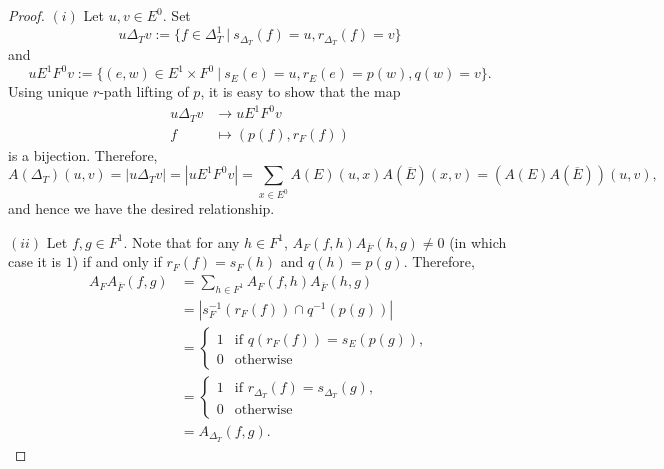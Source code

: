 \documentclass[a4paper,reqno,12pt]{amsart}
\theoremstyle{definition}
\theoremstyle{remark}
\begin{document}
\begin{proof}
$(i)$ Let $u,v\in E^0$. Set \[u\Delta_Tv:=\{f\in \Delta_T^1~|~s_{\Delta_T}(f)=u,r_{\Delta_T}(f)=v\}\] and \[uE^1F^0v:=\{(e,w)\in E^1\times F^0~|~s_E(e)=u,r_E(e)=p(w),q(w)=v\}.\] Using unique $r$-path lifting of $p$, it is easy to show that the map 
\begin{align*}
    u\Delta_Tv&\longrightarrow uE^1F^0v\\
    f&\longmapsto (p(f),r_F(f))
\end{align*}
is a bijection. Therefore, \[A(\Delta_T)(u,v)=|u\Delta_Tv|=|uE^1F^0v|=\displaystyle{\sum_{x\in E^0}}A(E)(u,x)A(\overline{E})(x,v)=(A(E)A(\overline{E}))(u,v),\] and hence we have the desired relationship.

$(ii)$ Let $f,g\in F^1$. Note that for any $h\in F^1$, $A_F(f,h)A_{\overline{F}}(h,g)\neq 0$ (in which case it is $1$) if and only if $r_F(f)=s_F(h)$ and $q(h)=p(g)$. Therefore, 
\allowdisplaybreaks
{\begin{align*}
A_F A_{\overline{F}}(f,g)&=\displaystyle{\sum_{h\in F^1}}A_F(f,h)A_{\overline{F}}(h,g)\\
&=|s_F^{-1}(r_F(f))\cap q^{-1}(p(g))|\\
&=\left\{
	\begin{array}{ll}
		1  & \mbox{if } q(r_F(f))=s_E(p(g)), \\
		0 & \mbox{otherwise}
	\end{array}
	\right.\\
&=\left\{
	\begin{array}{ll}
		1  & \mbox{if } r_{\Delta_T}(f)=s_{\Delta_T}(g), \\
		0 & \mbox{otherwise}
	\end{array}
	\right.\\
&=A_{\Delta_T}(f,g).
\end{align*}
}
\end{proof} 
\end{document}
